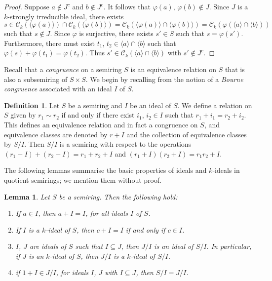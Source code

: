 \documentclass[11pt,english]{amsart}
\newtheorem{lemma}[theorem]{Lemma}
\theoremstyle{definition}
\newtheorem{definition}[theorem]{Definition}
\numberwithin{equation}{section}
\begin{document}
\begin{proof}
Suppose $a\notin J^c$ and $b\notin J^c$. It follows that $\varphi(a)$, $\varphi(b) \notin J$. Since $J$ is a $k$-strongly irreducible ideal, there exists \[s\in \mathcal{C}_k ( \langle \varphi (a) \rangle ) \cap \mathcal{C}_k (\langle \varphi (b) \rangle ) =\mathcal{C}_k( \langle \varphi (a) \rangle \cap \langle  \varphi (b) \rangle )=\mathcal{C}_k (\varphi (\langle a \rangle \cap \langle b \rangle))\] such that $s \notin J$. Since $\varphi$ is surjective, there exists $s' \in S$ such that $s=\varphi(s')$. Furthermore, there must exist $t_1$, $t_2 \in \langle a \rangle \cap \langle b \rangle$ such that $\varphi (s) + \varphi (t_1) =\varphi(t_2)$. Thus $s' \in \mathcal{C}_k (\langle a \rangle \cap \langle b \rangle )$ with $s' \notin J^c$.
\end{proof}

Recall that a \emph{congruence} on a semiring $S$ is an equivalence relation on $S$ that is also a subsemiring of $S \times S$. We begin by recalling from  \cite[Page 78]{Golan} the notion of a \emph{Bourne congruence} associated with an ideal $I$ of $S$.

\begin{definition}
    Let $S$ be a semiring and $I$ be an ideal of $S$. We define a relation on $S$ given by $r_1 \sim r_2$ if and only if there exist $i_1$, $i_2 \in I$ such that $r_1+i_1=r_2+i_2$. This defines an equivalence relation and in fact a congruence on $S$, and equivalence classes are denoted by $r+I$ and the collection of equivalence classes by $S/I$. Then $S/I$ is a semiring with respect to the operations $(r_1+I)+(r_2+I)=r_1+r_2+I$ and $(r_1+I)(r_2+I)=r_1r_2+I$. 
\end{definition}

The following lemmas summarise the basic properties of ideals and $k$-ideals in quotient semirings; we mention them without proof.

\begin{lemma}\label{loc12}
    Let $S$ be a semiring. Then the following hold:
    \begin{enumerate}
        \item If $a\in I$, then $a+I=I$, for all ideals $I$ of $S$.
        \item If $I$ is a $k$-ideal of $S$, then $c+I=I$ if and only if $c \in I$.
        \item $I$, $J$ are ideals of $S$ such that $I\subseteq J$, then $J/I$ is an ideal of $S/I$. In particular, if $J$ is an $k$-ideal of $S$, then $J/I$ is a $k$-ideal of $S/I$.
        \item if $1+I\in J/I$, for ideals $I$, $J$ with $I \subseteq J$, then $S/I =J/I$.
    \end{enumerate}
\end{lemma}
\end{document}
